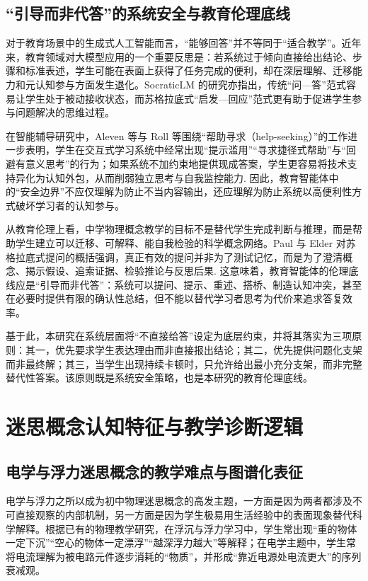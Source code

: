 \subsection{“引导而非代答”的系统安全与教育伦理底线}
\label{sec:4.1.2}

对于教育场景中的生成式人工智能而言，“能够回答”并不等同于“适合教学”。近年来，教育领域对大模型应用的一个重要反思是：若系统过于倾向直接给出结论、步骤和标准表述，学生可能在表面上获得了任务完成的便利，却在深层理解、迁移能力和元认知参与方面发生退化。SocraticLM 的研究亦指出，传统“问—答”范式容易让学生处于被动接收状态，而苏格拉底式“启发—回应”范式更有助于促进学生参与问题解决的思维过程\cite{liu2024socraticlm}。

在智能辅导研究中，Aleven 等与 Roll 等围绕“帮助寻求（help-seeking）”的工作进一步表明，学生在交互式学习系统中经常出现“提示滥用”“寻求捷径式帮助”与“回避有意义思考”的行为；如果系统不加约束地提供现成答案，学生更容易将技术支持异化为认知外包，从而削弱独立思考与自我监控能力\cite{aleven2004toward,roll2011improving}. 因此，教育智能体中的“安全边界”不应仅理解为防止不当内容输出，还应理解为防止系统以高便利性方式破坏学习者的认知参与。

从教育伦理上看，中学物理概念教学的目标不是替代学生完成判断与推理，而是帮助学生建立可以迁移、可解释、能自我检验的科学概念网络。Paul 与 Elder 对苏格拉底式提问的概括强调，真正有效的提问并非为了测试记忆，而是为了澄清概念、揭示假设、追索证据、检验推论与反思后果\cite{paul2019thinkers}. 这意味着，教育智能体的伦理底线应是“引导而非代答”：系统可以提问、提示、重述、搭桥、制造认知冲突，甚至在必要时提供有限的确认性总结，但不能以替代学习者思考为代价来追求答复效率。

基于此，本研究在系统层面将“不直接给答”设定为底层约束，并将其落实为三项原则：其一，优先要求学生表达理由而非直接报出结论；其二，优先提供问题化支架而非最终解；其三，当学生出现持续卡顿时，只允许给出最小充分支架，而非完整替代性答案。该原则既是系统安全策略，也是本研究的教育伦理底线。

\section{迷思概念认知特征与教学诊断逻辑}
\label{sec:4.2}

\subsection{电学与浮力迷思概念的教学难点与图谱化表征}
\label{sec:4.2.1}

电学与浮力之所以成为初中物理迷思概念的高发主题，一方面是因为两者都涉及不可直接观察的内部机制，另一方面是因为学生极易用生活经验中的表面现象替代科学解释。根据已有的物理教学研究，在浮沉与浮力学习中，学生常出现“重的物体一定下沉”“空心的物体一定漂浮”“越深浮力越大”等解释\cite{unal2008changing,shen2017assessing}；在电学主题中，学生常将电流理解为被电路元件逐步消耗的“物质”，并形成“靠近电源处电流更大”的序列衰减观\cite{shipstone1984study,kucukozer2007misconceptions}。

